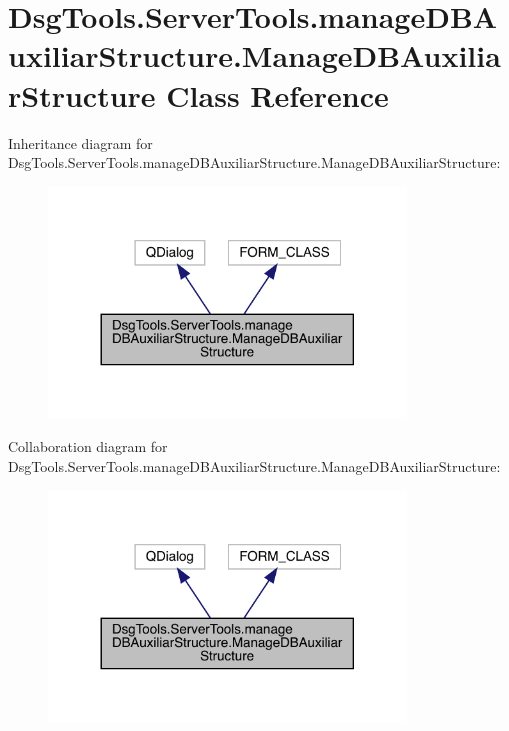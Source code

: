 \hypertarget{class_dsg_tools_1_1_server_tools_1_1manage_d_b_auxiliar_structure_1_1_manage_d_b_auxiliar_structure}{}\section{Dsg\+Tools.\+Server\+Tools.\+manage\+D\+B\+Auxiliar\+Structure.\+Manage\+D\+B\+Auxiliar\+Structure Class Reference}
\label{class_dsg_tools_1_1_server_tools_1_1manage_d_b_auxiliar_structure_1_1_manage_d_b_auxiliar_structure}


Inheritance diagram for Dsg\+Tools.\+Server\+Tools.\+manage\+D\+B\+Auxiliar\+Structure.\+Manage\+D\+B\+Auxiliar\+Structure\+:
\nopagebreak
\begin{figure}[H]
\begin{center}
\leavevmode
\includegraphics[width=269pt]{class_dsg_tools_1_1_server_tools_1_1manage_d_b_auxiliar_structure_1_1_manage_d_b_auxiliar_structure__inherit__graph}
\end{center}
\end{figure}


Collaboration diagram for Dsg\+Tools.\+Server\+Tools.\+manage\+D\+B\+Auxiliar\+Structure.\+Manage\+D\+B\+Auxiliar\+Structure\+:
\nopagebreak
\begin{figure}[H]
\begin{center}
\leavevmode
\includegraphics[width=269pt]{class_dsg_tools_1_1_server_tools_1_1manage_d_b_auxiliar_structure_1_1_manage_d_b_auxiliar_structure__coll__graph}
\end{center}
\end{figure}
